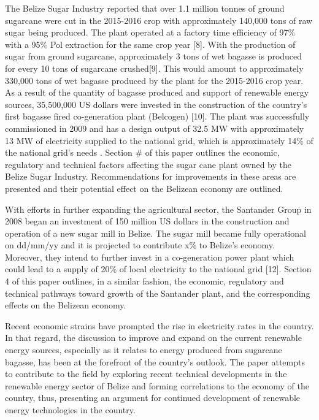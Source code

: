 \documentclass[twocolumn,10pt]{asme2e}
\begin{document}
The Belize Sugar Industry reported that over 1.1 million tonnes of ground sugarcane were cut in the 2015-2016 crop with approximately 140,000 tons of raw sugar being produced. The plant operated at a factory time efficiency of 97\% with a 95\% Pol extraction for the same crop year [8]. With the production of sugar from ground sugarcane, approximately 3 tons of wet bagasse is produced for every 10 tons of sugarcane crushed[9]. This would amount to approximately 330,000 tons of wet bagasse produced by the plant for the 2015-2016 crop year. As a result of the quantity of bagasse produced and support of renewable energy sources, 35,500,000 US dollars were invested in the construction of the country's first bagasse fired co-generation plant (Belcogen) [10]. The plant was successfully commissioned in 2009 and has a design output of 32.5 MW with approximately 13 MW of electricity supplied to the national grid, which is approximately 14\% of the national grid's needs \cite{asr_report}. Section \# of this paper outlines the economic, regulatory and technical factors affecting the sugar cane plant owned by the Belize Sugar Industry.  Recommendations for improvements in these areas  are presented and their potential effect on the Belizean economy are outlined.

With efforts in further expanding the agricultural sector, the Santander Group in 2008 began an investment of 150 million US dollars in the construction and operation of a new sugar mill in Belize. The sugar mill became fully operational on dd/mm/yy and it is projected to contribute x\% to Belize's economy. Moreover, they intend to further invest in a co-generation power plant which could lead to a supply of 20\% of local electricity to the national grid [12]. Section 4 of this paper outlines, in a similar fashion, the economic, regulatory and technical pathways toward growth of the Santander plant, and the corresponding effects on the Belizean economy.  

Recent economic strains have prompted the rise in electricity rates in the country. In that regard, the discussion to improve and expand on the current renewable energy sources, especially as it relates to energy produced from sugarcane bagasse, has been at the forefront of the country's outlook. The paper attempts to contribute to the field by exploring  recent technical developments  in the renewable energy sector of Belize and forming correlations to the economy  of the country, thus, presenting an argument for continued development of renewable  energy technologies in the country. 
\end{document}
